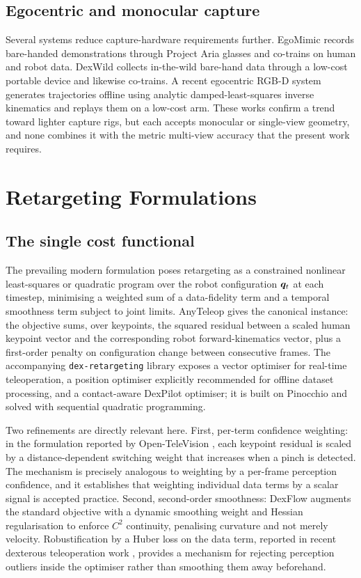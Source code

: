 \subsection{Egocentric and monocular capture}

Several systems reduce capture-hardware requirements further. EgoMimic
\cite{egomimic} records bare-handed demonstrations through Project Aria glasses
and co-trains on human and robot data. DexWild \cite{dexwild} collects
in-the-wild bare-hand data through a low-cost portable device and likewise
co-trains. A recent egocentric RGB-D system \cite{shadowing} generates
trajectories offline using analytic damped-least-squares inverse kinematics and
replays them on a low-cost arm. These works confirm a trend toward lighter
capture rigs, but each accepts monocular or single-view geometry, and none
combines it with the metric multi-view accuracy that the present work requires.

\section{Retargeting Formulations}
\label{sec:lit-retarget}

\subsection{The single cost functional}

The prevailing modern formulation poses retargeting as a constrained nonlinear
least-squares or quadratic program over the robot configuration $\bm{q}_t$ at each
timestep, minimising a weighted sum of a data-fidelity term and a temporal
smoothness term subject to joint limits. AnyTeleop \cite{anyteleop} gives the
canonical instance: the objective sums, over keypoints, the squared residual
between a scaled human keypoint vector and the corresponding robot
forward-kinematics vector, plus a first-order penalty on configuration change
between consecutive frames. The accompanying \texttt{dex-retargeting} library
exposes a vector optimiser for real-time teleoperation, a position optimiser
explicitly recommended for offline dataset processing, and a contact-aware
DexPilot optimiser; it is built on Pinocchio and solved with sequential
quadratic programming.

Two refinements are directly relevant here. First, per-term confidence
weighting: in the formulation reported by Open-TeleVision \cite{opentv}, each
keypoint residual is scaled by a distance-dependent switching weight that
increases when a pinch is detected. The mechanism is precisely analogous to
weighting by a per-frame perception confidence, and it establishes that
weighting individual data terms by a scalar signal is accepted practice.
Second, second-order smoothness: DexFlow \cite{dexflow} augments the standard
objective with a dynamic smoothing weight and Hessian regularisation to enforce
$C^2$ continuity, penalising curvature and not merely velocity. Robustification
by a Huber loss on the data term, reported in recent dexterous teleoperation
work \cite{dexteleop0}, provides a mechanism for rejecting perception outliers
inside the optimiser rather than smoothing them away beforehand.

